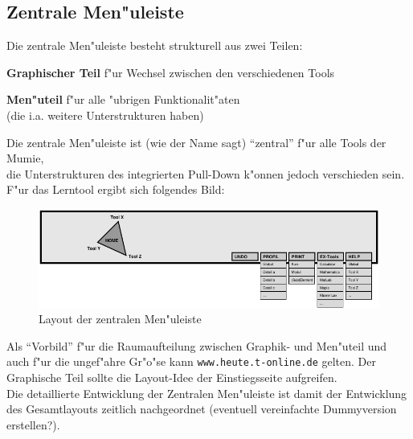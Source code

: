 \clearpage


\subsection{Zentrale Men"uleiste}

Die zentrale Men"uleiste besteht strukturell aus zwei Teilen:

\begin{list_sabina}
        \item \textbf{Graphischer Teil} f"ur Wechsel zwischen den
          verschiedenen Tools
        \item \textbf{Men"uteil} f"ur alle "ubrigen Funktionalit"aten\\
          (die i.a. weitere Unterstrukturen haben)
\end{list_sabina}                                                                                     

Die zentrale Men"uleiste ist (wie der Name sagt) ``zentral'' f"ur alle Tools der Mumie, \\
die Unterstrukturen des integrierten Pull-Down k"onnen jedoch verschieden
sein.\\
F"ur das Lerntool ergibt sich folgendes Bild:

\begin{figure}[h]
\begin{center}
\ifx\pdfoutput\undefined
\else
  \includegraphics{Skizzen/zent_menue.pdf}
\fi
\caption{Layout der zentralen Men"uleiste}
\end{center}
\end{figure}                                   

Als ``Vorbild'' f"ur die Raumaufteilung zwischen Graphik- und Men"uteil und
auch f"ur die ungef"ahre Gr"o"se kann \verb?www.heute.t-online.de? gelten.
Der Graphische Teil sollte die Layout-Idee der Einstiegsseite aufgreifen.\\
Die detaillierte Entwicklung der Zentralen Men"uleiste ist damit der
Entwicklung des Gesamtlayouts zeitlich nachgeordnet (eventuell vereinfachte 
Dummyversion erstellen?).

